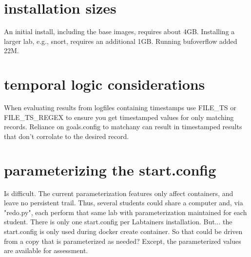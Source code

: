 \section {installation sizes}
An initial install, including the base images, requires about 4GB.  Installing a larger lab,
e.g., snort, requires an additional 1GB.  Running bufoverflow added 22M.

\section {temporal logic considerations}
When evaluating results from logfiles containing timestamps use FILE\_TS or FILE\_TS\_REGEX
to ensure you get timestamped values for only matching records. Reliance on goals.config to
matchany can result in timestamped results that don't corrolate to the desired record. 

\section {parameterizing the start.config}
Is difficult.  The current parameterization features only affect containers, and leave no
persistent trail.  Thus, several students could share a computer and, via "redo.py", each 
perform that same lab with parameterization maintained for each student.  There is only one
start.config per Labtainers installation.   But... the start.config is only used during
docker create container.  So that could be driven from a copy that is parameterized as needed?
Except, the parameterized values are available for assessment.
